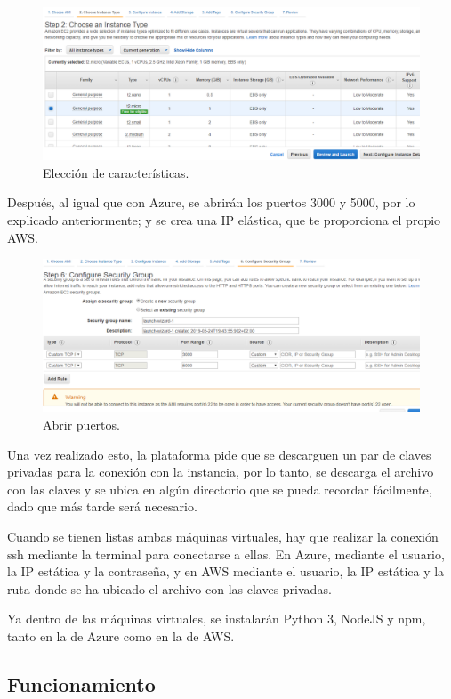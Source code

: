 \documentclass[english,runningheads,a4paper]{llncs}[2018/03/10]
\begin{document}
\begin{figure}[h!]
 \includegraphics[width=\linewidth]{./Web/AWS/AWS2.png}
 \caption{Elección de características.}
\end{figure}

Después, al igual que con Azure, se abrirán los puertos 3000 y 5000, por lo
explicado anteriormente; y se crea una IP elástica, que te proporciona el propio
AWS.

\begin{figure}[h!]
 \includegraphics[width=\linewidth]{./Web/AWS/AWS3.png}
 \caption{Abrir puertos.}
\end{figure}

Una vez realizado esto, la plataforma pide que se descarguen un par de claves
privadas para la conexión con la instancia, por lo tanto, se descarga el archivo
con las claves y se ubica en algún directorio que se pueda recordar fácilmente,
dado que más tarde será necesario.

Cuando se tienen listas ambas máquinas virtuales, hay que realizar la conexión ssh
mediante la terminal para conectarse a ellas. En Azure, mediante el usuario, la IP
estática y la contraseña, y en AWS mediante el usuario, la IP estática y la ruta
donde se ha ubicado el archivo con las claves privadas.

Ya dentro de las máquinas virtuales, se instalarán Python 3, NodeJS y npm, tanto en
la de Azure como en la de AWS.

\subsection{Funcionamiento}
\end{document}
